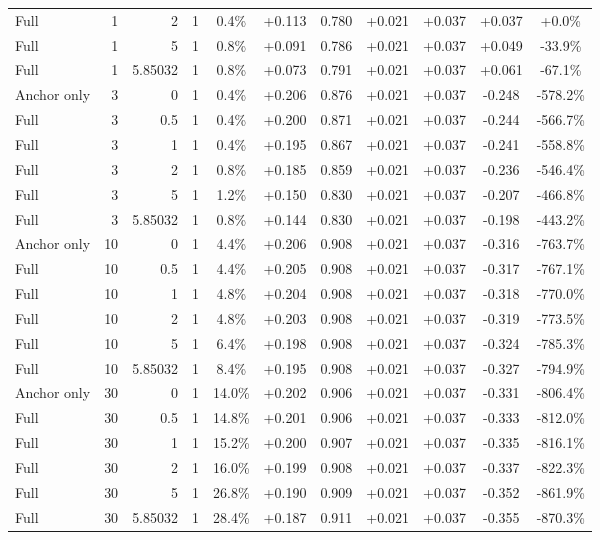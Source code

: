 \begin{table}[htbp]
\begin{tabular}{lrrrccccccc}
Full & 1 & 2 & 1 & 0.4\% & +0.113 & 0.780 & +0.021 & +0.037 & +0.037 & +0.0\% \\
Full & 1 & 5 & 1 & 0.8\% & +0.091 & 0.786 & +0.021 & +0.037 & +0.049 & -33.9\% \\
Full & 1 & 5.85032 & 1 & 0.8\% & +0.073 & 0.791 & +0.021 & +0.037 & +0.061 & -67.1\% \\
Anchor only & 3 & 0 & 1 & 0.4\% & +0.206 & 0.876 & +0.021 & +0.037 & -0.248 & -578.2\% \\
Full & 3 & 0.5 & 1 & 0.4\% & +0.200 & 0.871 & +0.021 & +0.037 & -0.244 & -566.7\% \\
Full & 3 & 1 & 1 & 0.4\% & +0.195 & 0.867 & +0.021 & +0.037 & -0.241 & -558.8\% \\
Full & 3 & 2 & 1 & 0.8\% & +0.185 & 0.859 & +0.021 & +0.037 & -0.236 & -546.4\% \\
Full & 3 & 5 & 1 & 1.2\% & +0.150 & 0.830 & +0.021 & +0.037 & -0.207 & -466.8\% \\
Full & 3 & 5.85032 & 1 & 0.8\% & +0.144 & 0.830 & +0.021 & +0.037 & -0.198 & -443.2\% \\
Anchor only & 10 & 0 & 1 & 4.4\% & +0.206 & 0.908 & +0.021 & +0.037 & -0.316 & -763.7\% \\
Full & 10 & 0.5 & 1 & 4.4\% & +0.205 & 0.908 & +0.021 & +0.037 & -0.317 & -767.1\% \\
Full & 10 & 1 & 1 & 4.8\% & +0.204 & 0.908 & +0.021 & +0.037 & -0.318 & -770.0\% \\
Full & 10 & 2 & 1 & 4.8\% & +0.203 & 0.908 & +0.021 & +0.037 & -0.319 & -773.5\% \\
Full & 10 & 5 & 1 & 6.4\% & +0.198 & 0.908 & +0.021 & +0.037 & -0.324 & -785.3\% \\
Full & 10 & 5.85032 & 1 & 8.4\% & +0.195 & 0.908 & +0.021 & +0.037 & -0.327 & -794.9\% \\
Anchor only & 30 & 0 & 1 & 14.0\% & +0.202 & 0.906 & +0.021 & +0.037 & -0.331 & -806.4\% \\
Full & 30 & 0.5 & 1 & 14.8\% & +0.201 & 0.906 & +0.021 & +0.037 & -0.333 & -812.0\% \\
Full & 30 & 1 & 1 & 15.2\% & +0.200 & 0.907 & +0.021 & +0.037 & -0.335 & -816.1\% \\
Full & 30 & 2 & 1 & 16.0\% & +0.199 & 0.908 & +0.021 & +0.037 & -0.337 & -822.3\% \\
Full & 30 & 5 & 1 & 26.8\% & +0.190 & 0.909 & +0.021 & +0.037 & -0.352 & -861.9\% \\
Full & 30 & 5.85032 & 1 & 28.4\% & +0.187 & 0.911 & +0.021 & +0.037 & -0.355 & -870.3\% \\

\end{tabular}
\end{table}
